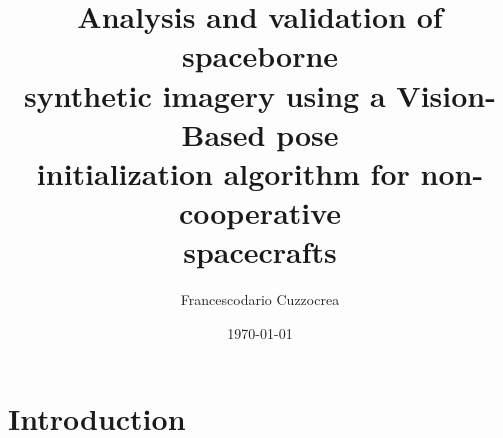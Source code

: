 \documentclass[10pt]{beamer}
\title{Analysis and validation of spaceborne \\ synthetic imagery using a Vision-Based pose \\ initialization algorithm for non-cooperative \\ spacecrafts}
\subtitle{}
\author{Francescodario Cuzzocrea}
\date{\today}
\newcommand{\tikzrarrow}{\tikz\draw[>=triangle 60, ->](0,0) -- (0.5,0) node{};}
\begin{document}
{
  \vfuzz=90pt
}

\begin{frame}
  \maketitle
\end{frame}

\section{Introduction}
\begin{frame}[plain]{}
  \sectionpage
\end{frame}

%
%
%
%

\end{document}
